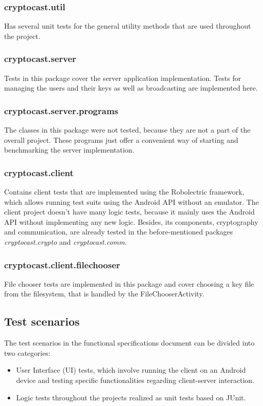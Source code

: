 \documentclass[a4paper,10pt]{scrartcl}
\begin{document}
\subsubsection{cryptocast.util}
Has several unit tests for the general utility methods that are used throughout the project.
\subsubsection{cryptocast.server}
Tests in this package cover the server application implementation. Tests for managing the users and their keys as well as broadcasting are implemented here.

\subsubsection{cryptocast.server.programs}
The classes in this package were not tested, because they are not a part of the overall project. These programs just offer a convenient way of starting and benchmarking the server implementation.

\subsubsection{cryptocast.client}
Contains client tests that are implemented using the Robolectric framework, which allows running test suits using the Android API without an emulator. The client project doesn't have many logic tests, because it mainly uses the Android API without implementing any new logic. Besides, its components, cryptography and communication, are already tested in the before-mentioned packages \textit{cryptocast.crypto} and \textit{cryptocast.comm}.

\subsubsection{cryptocast.client.filechooser}
File chooser tests are implemented in this package and cover choosing a key file from the filesystem, that is handled by the FileChooserActivity.


\subsection{Test scenarios}
The test scenarios in the functional specifications document can be divided into two categories:

\begin{itemize}
	\item User Interface (UI) tests, which involve running the client on an Android device and testing specific functionalities regarding client-server interaction.
	\item Logic tests throughout the projects realized as unit tests based on JUnit. 
\end{itemize}
\end{document}

